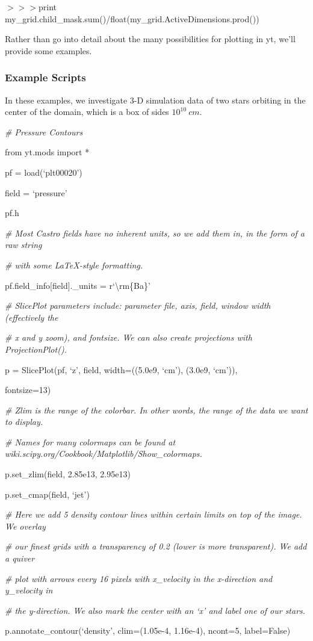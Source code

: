 {\scriptsize$>>>$}print my\_grid.child\_mask.sum()/float(my\_grid.ActiveDimensions.prod())

Rather than go into detail about the many possibilities for plotting
in yt, we'll provide some examples.

\subsubsection{Example Scripts}

In these examples, we investigate 3-D simulation data of two stars
orbiting in the center of the domain, which is a box of sides
$10^{10}\:cm$.


{\it\# Pressure Contours}
{\setlength{\parskip}{0pt}

from yt.mods import *
}

pf = load(`plt00020')

field = `pressure'

pf.h

{\it\# Most Castro fields have no inherent units, so we add them in,
  in the form of a raw string} 

{\setlength{\parskip}{0pt}

{\it\# with some LaTeX-style formatting.}

pf.field\_info[field].\_units = r`\textbackslash rm\{Ba\}'
}


{\it\# SlicePlot parameters include: parameter file, axis, field, window width (effectively the}
{\setlength{\parskip}{0pt}

{\it\# x and y zoom), and fontsize. We can also create projections with ProjectionPlot().}

p = SlicePlot(pf, `z', field, width=((5.0e9, `cm'), (3.0e9, `cm')),

{\setlength{\parindent}{68pt}fontsize=13)}
}

{\it\# Zlim is the range of the colorbar. In other words, the range of the data we want to display.}
{\setlength{\parskip}{0pt}

{\it\# Names for many colormaps can be found at wiki.scipy.org/Cookbook/Matplotlib/Show\_colormaps.}

p.set\_zlim(field, 2.85e13, 2.95e13)
}

p.set\_cmap(field, `jet')

{\it\# Here we add 5 density contour lines within certain limits on top of the image. We overlay}
{\setlength{\parskip}{0pt}

{\it\# our finest grids with a transparency of 0.2 (lower is more transparent). We add a quiver}

{\it\# plot with arrows every 16 pixels with x\_velocity in the x-direction and y\_velocity in}

{\it\# the y-direction. We also mark the center with an `x' and label one of our stars.}

p.annotate\_contour(`density', clim=(1.05e-4, 1.16e-4), ncont=5, label=False)
}

